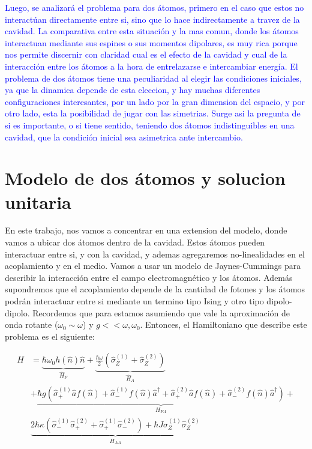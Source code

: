 \textcolor{blue}{Luego, se analizar\'a el problema para dos átomos, primero en el caso que estos no interact\'uan
directamente entre si, sino que lo hace indirectamente a travez de la cavidad. La comparativa entre
esta situación y la mas comun, donde los átomos interactuan mediante sus espines o sus momentos
dipolares, es muy rica porque nos permite discernir con claridad cual es el efecto de la cavidad
y cual de la interacción entre los átomos a la hora de entrelazarse e intercambiar energía.
El problema de dos átomos tiene una peculiaridad al elegir las condiciones iniciales, ya que la
dinamica depende de esta eleccion, y hay muchas diferentes configuraciones interesantes, por un lado
por la gran dimension del espacio, y por otro lado, esta la posibilidad de jugar con las simetrias.
Surge asi la pregunta de si es importante, o si tiene sentido, teniendo dos átomos indistinguibles
en una cavidad, que la condición inicial sea asimetrica ante intercambio. 
}

\section{Modelo de dos átomos y solucion unitaria}
En este trabajo, nos vamos a concentrar en una extension del modelo, donde vamos a ubicar dos átomos dentro de la cavidad. Estos átomos pueden interactuar entre si, y con la cavidad, y ademas agregaremos no-linealidades en el acoplamiento y en el medio.
Vamos a usar un modelo de Jaynes-Cummings para describir la interacci\'on entre el campo electromagn\'etico y los átomos. Adem\'as supondremos que el acoplamiento depende de la cantidad de fotones y los átomos podr\'an interactuar entre si mediante un termino tipo Ising y otro tipo dipolo-dipolo. Recordemos que para estamos asumiendo que vale la aproximaci\'on de onda rotante ($\omega_0 \sim \omega$) y $g << \omega,\omega_0$.
Entonces, el Hamiltoniano que describe este problema es el siguiente:

\begin{equation}
\begin{split}
     \hat H & =\underbrace{\hbar \omega_0 h(\hat n) \hat n }_{\hat H_F}+\underbrace{\frac{\hbar \omega}{2}(\hat\sigma_Z^{(1)}+\hat\sigma_Z^{(2)})}_{\hat H_A}   \\ 
     & + \underbrace{\hbar g(\hat\sigma_+^{(1)}\hat a f(\hat n)+\hat\sigma_-^{(1)}f(\hat n) \hat a^\dagger + \hat\sigma_+^{(2)}\hat a f(\hat n)+\hat\sigma_-^{(2)}f(\hat n) \hat a^\dagger)}_{H_{FA}} + \\ & \underbrace{2\hbar \kappa (\hat \sigma_-^{(1)}\hat \sigma_+^{(2)}+\hat \sigma_+^{(1)}\hat \sigma_-^{(2)}) + \hbar J \hat \sigma_Z^{(1)}\hat \sigma_Z^{(2)}}_{H_{AA}}
\end{split}
\end{equation}

